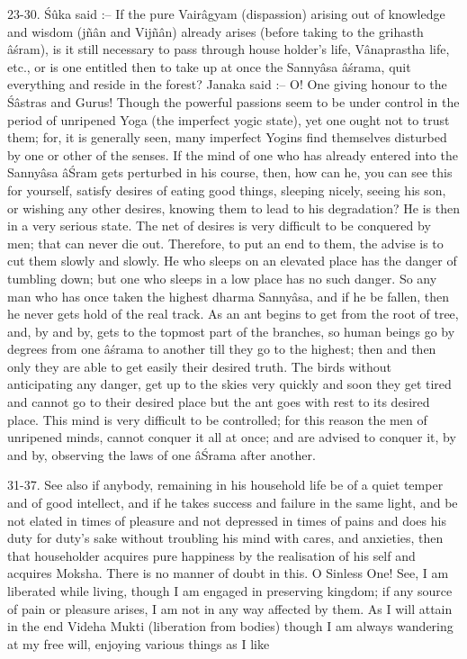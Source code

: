 23-30. \'S\^uka said :-- If the pure Vair\^agyam (dispassion) arising out of knowledge and wisdom (jñ\^an and Vijñ\^an) already arises (before taking to the grihasth \^a\'sram), is it still necessary to pass through house holder’s life, V\^anaprastha life, etc., or is one entitled then to take up at once the Sanny\^asa \^a\'srama, quit everything and reside in the forest? Janaka said :-- O! One giving honour to the \'S\^astras and Gurus! Though the powerful passions seem to be under control in the period of unripened Yoga (the imperfect yogic state), yet one ought not to trust them; for, it is generally seen, many imperfect Yogins find themselves disturbed by one or other of the senses. If the mind of one who has already entered into the Sanny\^asa \^a\'Sram gets perturbed in his course, then, how can he, you can see this for yourself, satisfy desires of eating good things, sleeping nicely, seeing his son, or wishing any other desires, knowing them to lead to his degradation? He is then in a very serious state. The net of desires is very difficult to be conquered by men; that can never die out. Therefore, to put an end to them, the advise is to cut them slowly and slowly. He who sleeps on an elevated place has the danger of tumbling down; but one who sleeps in a low place has no such danger. So any man who has once taken the highest dharma Sanny\^asa, and if he be fallen, then he never gets hold of the real track. As an ant begins to get from the root of tree, and, by and by, gets to the topmost part of the branches, so human beings go by degrees from one \^a\'srama to another till they go to the highest; then and then only they are able to get easily their desired truth. The birds without anticipating any danger, get up to the skies very quickly and soon they get tired and cannot go to their desired place but the ant goes with rest to its desired place. This mind is very difficult to be controlled; for this reason the men of unripened minds, cannot conquer it all at once; and are advised to conquer it, by and by, observing the laws of one \^a\'Srama after another.

31-37. See also if anybody, remaining in his household life be of a quiet temper and of good intellect, and if he takes success and failure in the same light, and be not elated in times of pleasure and not depressed in times of pains and does his duty for duty’s sake without troubling his mind with cares, and anxieties, then that householder acquires pure happiness by the realisation of his self and acquires Moksha. There is no manner of doubt in this. O Sinless One! See, I am liberated while living, though I am engaged in preserving kingdom; if any source of pain or pleasure arises, I am not in any way affected by them. As I will attain in the end Videha Mukti (liberation from bodies) though I am always wandering at my free will, enjoying various things as I like

